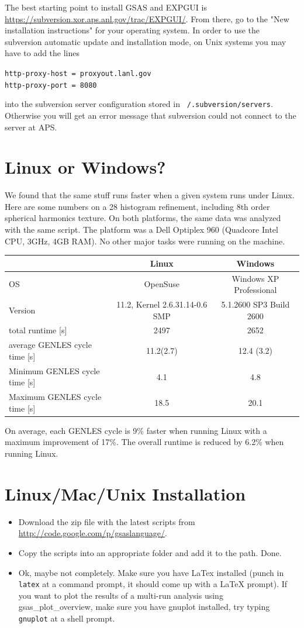 The best starting point to install GSAS and EXPGUI is \url{https://subversion.xor.aps.anl.gov/trac/EXPGUI/}. From there, go to the "New installation instructions" for your operating system. In order to use the subversion automatic update and installation mode, on Unix systems you may have to add the lines

\texttt{http-proxy-host = proxyout.lanl.gov\\
http-proxy-port = 8080\\
}

into the subversion server configuration stored in \texttt{~/.subversion/servers}. Otherwise you will get an error message that subversion could not connect to the server at APS.


\section{Linux or Windows?}

We found that the same stuff runs faster when a given system runs under Linux. Here are some numbers on a 28 histogram refinement, including 8th order spherical harmonics texture. On both platforms, the same data was analyzed with the same script. The platform was a Dell Optiplex 960 (Quadcore Intel CPU, 3GHz, 4GB RAM). No other major tasks were running on the machine.

\begin{tabular}{|l|c|c|}
\hline
&Linux&Windows\\
\hline
OS&OpenSuse&Windows XP Professional\\
Version&11.2, Kernel 2.6.31.14-0.6 SMP&5.1.2600 SP3 Build 2600\\
total runtime [s]&2497&2652\\
average GENLES cycle time [s]&11.2(2.7)&12.4 (3.2)\\
Minimum GENLES cycle time [s]&4.1&4.8\\
Maximum GENLES cycle time [s]&18.5&20.1\\
\hline
\end{tabular}

On average, each GENLES cycle is 9\% faster when running Linux with a maximum improvement of 17\%. The overall runtime is reduced by 6.2\% when running Linux.

\section{Linux/Mac/Unix Installation}

\begin{itemize}
\item Download the zip file with the latest scripts from \url{http://code.google.com/p/gsaslanguage/}. 
\item Copy the scripts into an appropriate folder and add it to the path. Done.
\item Ok, maybe not completely. Make sure you have LaTex installed (punch in \texttt{latex} at a command prompt, it should come up with a LaTeX prompt). If you want to plot the results of a multi-run analysis using gsas\_plot\_overview, make sure you have gnuplot installed, try typing \texttt{gnuplot} at a shell prompt.
\end{itemize}

